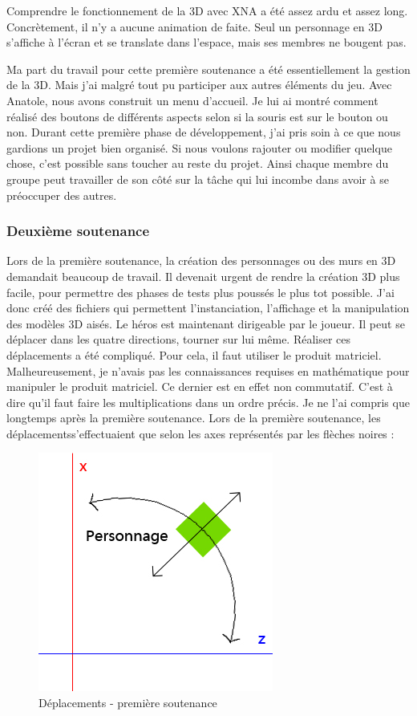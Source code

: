 \documentclass[12pt]{article}
\begin{document}
Comprendre le fonctionnement de la 3D avec XNA a été assez ardu et assez long. Concrètement, il n'y a aucune animation de faite. Seul un personnage en 3D s'affiche à l'écran et se translate dans l'espace, mais ses membres ne bougent pas. 

Ma part du travail pour cette première soutenance a été essentiellement la gestion de la 3D. Mais j'ai malgré tout pu participer aux autres éléments du jeu. Avec Anatole, nous avons construit un menu d'accueil. Je lui ai montré comment réalisé des boutons de différents aspects selon si la souris est sur le bouton ou non. Durant cette première phase de développement, j'ai pris soin à ce que nous gardions un projet bien organisé. Si nous voulons rajouter ou modifier quelque chose, c'est possible sans toucher au reste du projet. Ainsi chaque membre du groupe peut travailler de son côté sur la tâche qui lui incombe dans avoir à se préoccuper des autres.

\subsubsection{Deuxième soutenance}

Lors de la première soutenance, la création des personnages ou des murs en 3D demandait beaucoup de travail. Il devenait urgent de rendre la création 3D plus facile, pour permettre des phases de tests plus poussés le plus tot possible. J'ai donc créé des fichiers qui permettent l'instanciation, l'affichage et la manipulation des modèles 3D aisés. Le héros est maintenant dirigeable par le joueur. Il peut se déplacer dans les quatre directions, tourner sur lui même. Réaliser ces déplacements a été compliqué. Pour cela, il faut utiliser le produit matriciel. Malheureusement, je n'avais pas les connaissances requises en mathématique pour manipuler le produit matriciel. Ce dernier est en effet non commutatif. C'est à dire qu'il faut faire les multiplications dans un ordre précis. Je ne l'ai compris que longtemps après la première soutenance. Lors de la première soutenance, les déplacementss'effectuaient que selon les axes représentés par les flèches noires : 

\begin{figure}[h]
\begin{center}
\includegraphics[scale=0.5]{deplac1.jpg}
\caption{Déplacements - première soutenance}
\end{center}
\end{figure}
\end{document}
